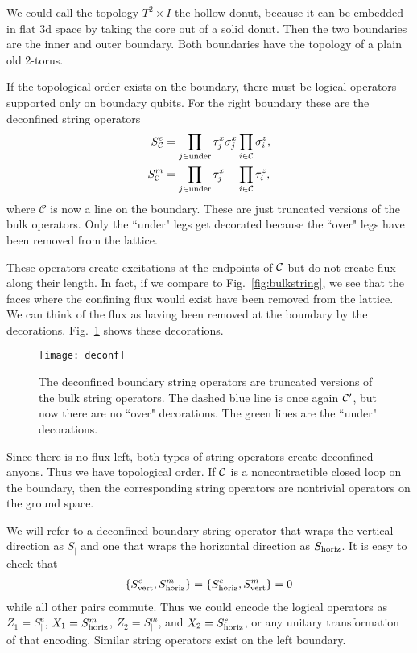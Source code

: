 We could call the topology $T^2\times I$ the hollow donut, because it can be embedded in flat 3d space by taking the core out of a solid donut. Then the two boundaries are the inner and outer boundary. Both boundaries have the topology of a plain old 2-torus.

If the topological order exists on the boundary, there must be logical operators supported only on boundary qubits. For the right boundary these are the deconfined string operators
\begin{align}
S^e_{\mathcal{C}} &= \prod_{j\in \text{under}}\tau_j^x \sigma_j^x \prod_{i\in\mathcal{C}} \sigma_i^z,\\
S^m_{\mathcal{C}} &= \prod_{j\in \text{under}}\tau_j^x\phantom{ \sigma_j^x} \prod_{i\in\mathcal{C}} \tau_i^z,
\end{align}
where $\mathcal{C}$ is now a line on the boundary. These are just truncated versions of the bulk operators. Only the ``under" legs get decorated because the ``over" legs have been removed from the lattice.

These operators create excitations at the endpoints of $\mathcal{C}$ but do not create flux along their length.  In fact, if we compare to Fig.~\ref{fig:bulkstring}, we see that the faces where the confining flux would exist have been removed from the lattice.
We can think of the flux as having been removed at the boundary by the decorations.  Fig.~\ref{fig:deconf} shows these decorations. 

\begin{figure}%
\centering
\texttt{[image: deconf]}
\caption[Deconfined boundary string operators]{The deconfined boundary string operators are truncated versions of the bulk string operators. The dashed blue line is once again $\mathcal{C}'$, but now there are no ``over" decorations. The green lines are the ``under" decorations.}
\label{fig:deconf}
\end{figure}

Since there is no flux left, both types of string operators create deconfined anyons. Thus we have topological order.
If $\mathcal{C}$ is a noncontractible closed loop on the boundary, then the corresponding string operators are nontrivial operators on the ground space.

We will refer to a deconfined boundary string operator that wraps the vertical direction as $S_\vert$ and one that wraps the horizontal direction as $S_{\text{horiz}}$. It is easy to check that 
\begin{align}
\{S^e_{\text{vert}},S^m_{\text{horiz}}\}=\{S^e_{\text{horiz}},S^m_{\text{vert}}\}=0
\end{align}
while all other pairs commute. Thus we could encode the logical operators as $Z_1=S^e_\vert$, $X_1 = S^m_{\text{horiz}}$, $Z_2 = S^m_\vert$, and $X_2 = S^e_{\text{horiz}}$, or any unitary transformation of that encoding. Similar string operators exist on the left boundary.

